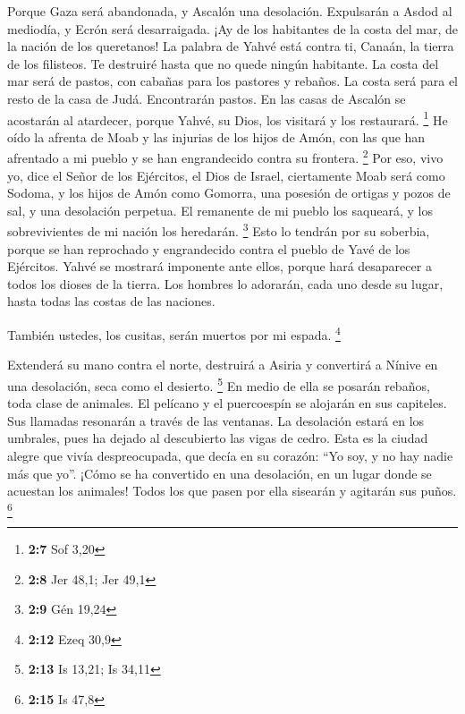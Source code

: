 \begin{paracol}{2}
 Porque Gaza será abandonada, y Ascalón una desolación.
Expulsarán a Asdod al mediodía, y Ecrón será desarraigada.
 ¡Ay de los habitantes de la costa del mar, de la nación
de los queretanos! La palabra de Yahvé está contra ti, Canaán, la tierra
de los filisteos. Te destruiré hasta que no quede ningún habitante.
 La costa del mar será de pastos, con cabañas para los
pastores y rebaños.  La costa será para el resto de la
casa de Judá. Encontrarán pastos. En las casas de Ascalón se acostarán
al atardecer, porque Yahvé, su Dios, los visitará y los restaurará.
\footnote{\textbf{2:7} Sof 3,20}  He oído la afrenta de
Moab y las injurias de los hijos de Amón, con las que han afrentado a mi
pueblo y se han engrandecido contra su frontera. \footnote{\textbf{2:8}
  Jer 48,1; Jer 49,1}  Por eso, vivo yo, dice el Señor de
los Ejércitos, el Dios de Israel, ciertamente Moab será como Sodoma, y
los hijos de Amón como Gomorra, una posesión de ortigas y pozos de sal,
y una desolación perpetua. El remanente de mi pueblo los saqueará, y los
sobrevivientes de mi nación los heredarán. \footnote{\textbf{2:9} Gén
  19,24}  Esto lo tendrán por su soberbia, porque se han
reprochado y engrandecido contra el pueblo de Yavé de los Ejércitos.
 Yahvé se mostrará imponente ante ellos, porque hará
desaparecer a todos los dioses de la tierra. Los hombres lo adorarán,
cada uno desde su lugar, hasta todas las costas de las naciones.

 También ustedes, los cusitas, serán muertos por mi
espada. \footnote{\textbf{2:12} Ezeq 30,9}

 Extenderá su mano contra el norte, destruirá a Asiria y
convertirá a Nínive en una desolación, seca como el desierto.
\footnote{\textbf{2:13} Is 13,21; Is 34,11}  En medio de
ella se posarán rebaños, toda clase de animales. El pelícano y el
puercoespín se alojarán en sus capiteles. Sus llamadas resonarán a
través de las ventanas. La desolación estará en los umbrales, pues ha
dejado al descubierto las vigas de cedro.  Esta es la
ciudad alegre que vivía despreocupada, que decía en su corazón: ``Yo
soy, y no hay nadie más que yo''. ¡Cómo se ha convertido en una
desolación, en un lugar donde se acuestan los animales! Todos los que
pasen por ella sisearán y agitarán sus puños. \footnote{\textbf{2:15} Is
  47,8}

\switchcolumn
\begin{otherlanguage}{english}


\end{otherlanguage}
\end{paracol}
